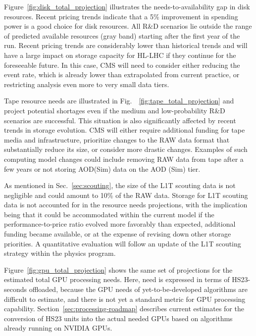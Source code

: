 Figure~\ref{fig:disk_total_projection} illustrates the needs-to-availability gap in disk resources. Recent pricing trends indicate that a 5\% improvement in spending power is a good choice for disk resources.  All R\&D scenarios lie outside the range of predicted available resources (gray band) starting after the first year of the run.  Recent pricing trends are considerably lower than historical trends and will have a large impact on storage capacity for HL-LHC if they continue for the foreseeable future. In this case, CMS will need to consider either reducing the event rate, which is already lower than extrapolated from current \RunThree practice, or restricting analysis even more to very small data tiers.

Tape resource needs are illustrated in Fig.~~\ref{fig:tape_total_projection} and project potential shortages even if the medium and low-probability R\&D scenarios are successful. This situation is also significantly affected by recent trends in storage evolution. CMS will either require additional funding for tape media and infrastructure, prioritize changes to the RAW data format that substantially reduce its size, or consider more drastic changes. Examples of such computing model changes could include removing RAW data from tape after a few years or not storing AOD(Sim) data on the AOD (Sim) tier. 

As mentioned in Sec.~\ref{sec:scouting}, the size of the \gls{L1T} scouting data is not negligible and could amount to 10\% of the \RunFour \gls{RAW} data. Storage for \gls{L1T} scouting data is not accounted for in the resource needs projections, with the implication being that it could be accommodated within the current model if the performance-to-price ratio evolved more favorably than expected, additional funding became available, or at the expense of revising down other storage priorities. A quantitative evaluation will follow an update of the \gls{L1T} scouting strategy within the physics program. 

Figure~\ref{fig:gpu_total_projection} shows the same set of projections for the estimated total \gls{GPU} processing needs. Here, need is expressed in terms of HS23-seconds offloaded, because the \gls{GPU} needs of yet-to-be-developed algorithms are difficult to estimate, and there is not yet a standard metric for \gls{GPU} processing capability. 
Section~\ref{sec:processing-roadmap} describes current estimates for the conversion of HS23 units into the actual needed \glspl{GPU} based on algorithms already running on NVIDIA \glspl{GPU}.


